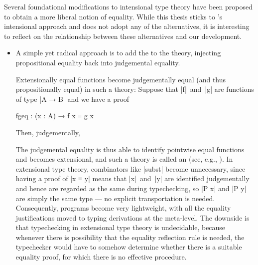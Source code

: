 Several foundational modifications to intensional type theory have been proposed to obtain a more liberal notion of equality.
While this thesis sticks to \Agda's intensional approach and does not adopt any of the alternatives, it is interesting to reflect on the relationship between these alternatives and our development.
\begin{itemize}
\item A simple yet radical approach is to add the  to the theory, injecting propositional equality back into judgemental equality.
\begin{center}
\DP
\end{center}
Extensionally equal functions become judgementally equal (and thus propositionally equal) in such a theory:
Suppose that |f|~and~|g| are functions of type |A → B| and we have a proof
\begin{code}
fgeq : (x : A) → f x ≡ g x
\end{code}
Then, judgementally,
The judgemental equality is thus able to identify pointwise equal functions and becomes extensional, and such a theory is called an  (see, e.g., \citet[Section~8.2]{Nordstrom-programming}).
In extensional type theory, combinators like |subst| become unnecessary, since having a proof of |x ≡ y| means that |x|~and~|y| are identified judgementally and hence are regarded as the same during typechecking, so |P x| and |P y| are simply the same type --- no explicit transportation is needed.
Consequently, programs become very lightweight, with all the equality justifications moved to typing derivations at the meta-level.
The downside is that typechecking in extensional type theory is undecidable, because whenever there is possibility that the equality reflection rule is needed, the typechecker would have to somehow determine whether there is a suitable equality proof, for which there is no effective procedure.

\end{itemize}
